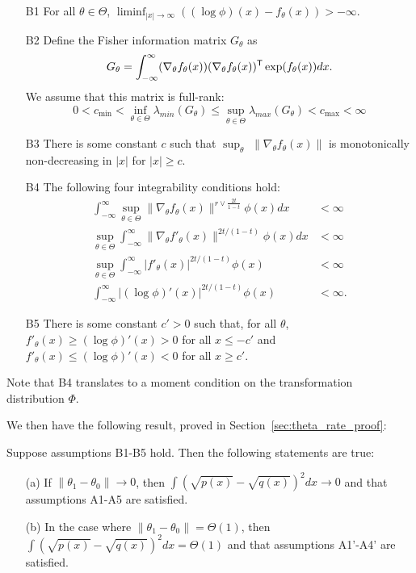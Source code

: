 \begin{enumerate}
\item[B1] For all $\theta \in \Theta$, $\liminf_{|x| \rightarrow \infty} \left( (\log \phi)(x) - f_\theta(x) \right) > -\infty$. 
\item[B2] Define the Fisher information matrix $G_\theta$ as
$$G_{\theta} = \int_{-\infty}^{\infty} (\nabla_{\theta} f_{\theta}(x)) 
                                    (\nabla_{\theta} f_{\theta}(x))^{\mathsf{T}} 
                      \exp( f_{\theta}(x)) dx.$$
 We assume that this matrix is full-rank:
   \[
 0<   c_{\min} <  \inf_{\theta \in \Theta} \lambda_{min}(G_\theta) \leq \sup_{\theta \in \Theta} \lambda_{max}(G_{\theta}) < c_{\max} < \infty
  \]
\item[B3] There is some constant $c$ such that $\sup_\theta$ $\| \nabla_{\theta} f_{\theta} (x) \|$ is monotonically non-decreasing in $|x|$ for $|x| \geq c$.
\item[B4] The following four integrability conditions hold:
  \begin{align*}
  \int_{-\infty}^\infty \sup_{\theta \in \Theta} \| \nabla_{\theta} f_\theta(x) \|^{r \vee \frac{2t}{1-t}} \phi(x) dx &< \infty\\
   \sup_{\theta \in \Theta} \int_{-\infty}^\infty \| \nabla_{\theta} f'_\theta(x) \|^{2t/(1-t)} \phi(x) dx &< \infty\\
  \sup_{\theta \in \Theta} \int_{-\infty}^\infty | f'_{\theta}(x) |^{2t/(1-t)} \phi(x) &< \infty   \\
        \int_{-\infty}^\infty | (\log \phi)'(x) |^{2t/(1-t)} \phi(x) &< \infty.  
  \end{align*}
\item[B5] There is some constant $c' > 0$ such that, for all $\theta$, $f'_\theta(x) \geq (\log \phi)'(x) > 0$ for all $x \leq -c'$ and 
          $f'_\theta(x) \leq (\log \phi)'(x) < 0$ for all $x \geq c'$.
\end{enumerate}
Note that B4 translates to a moment condition on the transformation distribution $\Phi$.

We then have the following result, proved in Section~\ref{sec:theta_rate_proof}:
\begin{proposition}
\label{prop:theta_rate}
Suppose assumptions B1-B5 hold. Then the following statements are true:
\begin{enumerate}
\item[(a)] If $\| \theta_1 - \theta_0 \| \rightarrow 0$, then $\int (\sqrt{p(x)} - \sqrt{q(x)})^2 dx \rightarrow 0$ and that assumptions A1-A5 are satisfied. 
\item[(b)] In the case where $\| \theta_1 - \theta_0\| = \Theta(1)$, then $\int (\sqrt{p(x)} - \sqrt{q(x)})^2 dx = \Theta(1)$ and that assumptions A1'-A4' are satisfied.
\end{enumerate}
\end{proposition}

